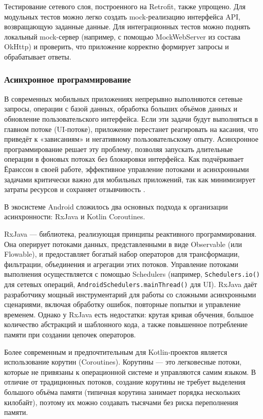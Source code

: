 Тестирование сетевого слоя, построенного на Retrofit, также упрощено. Для модульных тестов можно легко создать mock-реализацию интерфейса API, возвращающую заданные данные. Для интеграционных тестов можно поднять локальный mock-сервер (например, с помощью MockWebServer из состава OkHttp) и проверить, что приложение корректно формирует запросы и обрабатывает ответы. \cite{reff}

\subsubsection{Асинхронное программирование}

В современных мобильных приложениях непрерывно выполняются сетевые запросы, операции с базой данных, обработка больших объёмов данных и обновление пользовательского интерфейса. Если эти задачи будут выполняться в главном потоке (UI-потоке), приложение перестанет реагировать на касания, что приведёт к «зависаниям» и негативному пользовательскому опыту. Асинхронное программирование решает эту проблему, позволяя запускать длительные операции в фоновых потоках без блокировки интерфейса. Как подчёркивает Ёранссон в своей работе, эффективное управление потоками и асинхронными задачами критически важно для мобильных приложений, так как минимизирует затраты ресурсов и сохраняет отзывчивость \cite{refm}.

В экосистеме Android сложилось два основных подхода к организации асинхронности: RxJava и Kotlin Coroutines.

RxJava — библиотека, реализующая принципы реактивного программирования. Она оперирует потоками данных, представленными в виде Observable (или Flowable), и предоставляет богатый набор операторов для трансформации, фильтрации, объединения и агрегации этих потоков. Управление потоками выполнения осуществляется с помощью Schedulers (например, \texttt{Schedulers.io()} для сетевых операций, \texttt{AndroidSchedulers.mainThread()} для UI). RxJava даёт разработчику мощный инструментарий для работы со сложными асинхронными сценариями, включая обработку ошибок, повторные попытки и управление временем. Однако у RxJava есть недостатки: крутая кривая обучения, большое количество абстракций и шаблонного кода, а также повышенное потребление памяти при создании цепочек операторов.

Более современным и предпочтительным для Kotlin-проектов является использование корутин (Coroutines). Корутины — это легковесные потоки, которые не привязаны к операционной системе и управляются самим языком. В отличие от традиционных потоков, создание корутины не требует выделения большого объёма памяти (типичная корутина занимает порядка нескольких килобайт), поэтому их можно создавать тысячами без риска переполнения памяти.

